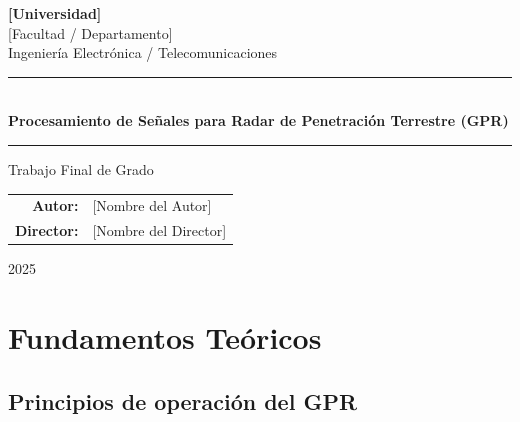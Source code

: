 \documentclass[12pt, a4paper, twoside]{report}
\newcommand{\TituloTesis}{Procesamiento de Señales para Radar de
Penetración Terrestre (GPR)}
\newcommand{\Autor}{[Nombre del Autor]}
\newcommand{\Director}{[Nombre del Director]}
\newcommand{\Institucion}{[Universidad]}
\newcommand{\Facultad}{[Facultad / Departamento]}
\newcommand{\Carrera}{Ingeniería Electrónica / Telecomunicaciones}
\newcommand{\AnioTesis}{2025}
\begin{document}
\begin{titlepage}
  \centering
  \vspace*{1.5cm}

  {\Large \textbf{\Institucion}}\\[0.4cm]
  {\large \Facultad}\\[0.4cm]
  {\large \Carrera}

  \vspace{1.5cm}
  \rule{\linewidth}{0.5pt}\\[0.4cm]
  {\LARGE \textbf{\TituloTesis}}\\[0.2cm]
  \rule{\linewidth}{0.5pt}

  \vspace{1.5cm}
  {\large Trabajo Final de Grado}

  \vfill

  \begin{tabular}{rl}
    \textbf{Autor:}    & \Autor    \\[4pt]
    \textbf{Director:} & \Director \\
  \end{tabular}

  \vspace{1.5cm}
  {\large \AnioTesis}
\end{titlepage}


\tableofcontents
\clearpage
\listoffigures
\clearpage
\listoftables
\clearpage


\chapter{Fundamentos Teóricos}
\label{ch:fundamentos}

\section{Principios de operación del GPR}
\end{document}
